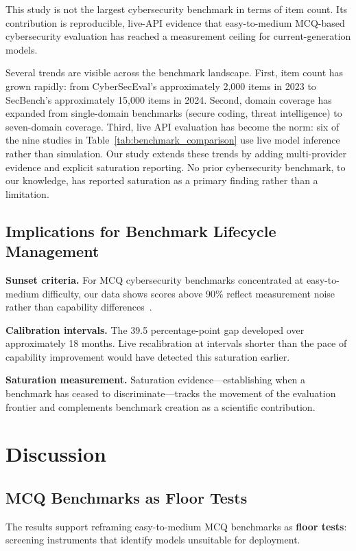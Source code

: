 \documentclass[final]{elsarticle}
\begin{document}
This study is not the largest cybersecurity benchmark in terms of item count. Its contribution is reproducible, live-API evidence that easy-to-medium MCQ-based cybersecurity evaluation has reached a measurement ceiling for current-generation models.

Several trends are visible across the benchmark landscape. First, item count has grown rapidly: from CyberSecEval's approximately 2,000 items in 2023 to SecBench's approximately 15,000 items in 2024. Second, domain coverage has expanded from single-domain benchmarks (secure coding, threat intelligence) to seven-domain coverage. Third, live API evaluation has become the norm: six of the nine studies in Table~\ref{tab:benchmark_comparison} use live model inference rather than simulation. Our study extends these trends by adding multi-provider evidence and explicit saturation reporting. No prior cybersecurity benchmark, to our knowledge, has reported saturation as a primary finding rather than a limitation.

\subsection{Implications for Benchmark Lifecycle Management}

\textbf{Sunset criteria.} For MCQ cybersecurity benchmarks concentrated at easy-to-medium difficulty, our data shows scores above 90\% reflect measurement noise rather than capability differences~\cite{nist2023airmf,owasp2024llm,mitre2024atlas}.

\textbf{Calibration intervals.} The 39.5 percentage-point gap developed over approximately 18 months. Live recalibration at intervals shorter than the pace of capability improvement would have detected this saturation earlier.

\textbf{Saturation measurement.} Saturation evidence---establishing when a benchmark has ceased to discriminate---tracks the movement of the evaluation frontier and complements benchmark creation as a scientific contribution.

\section{Discussion}

\subsection{MCQ Benchmarks as Floor Tests}

The results support reframing easy-to-medium MCQ benchmarks as \textbf{floor tests}: screening instruments that identify models unsuitable for deployment.
\end{document}
